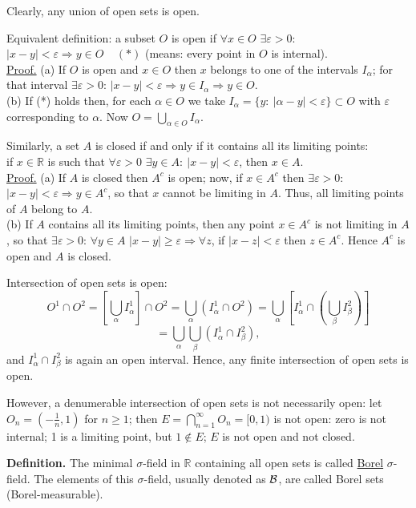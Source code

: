 \documentclass[a4paper,10pt]{article}
\def\RR{\mathbb{R}}
\newcommand{\1}[1]{\mathbf{1}_{\{#1\}}}
\begin{document}
Clearly, any union of open sets is open.

Equivalent definition: a subset $O$ is open if $\forall x\in O$ $\exists\varepsilon>0$: $|x-y|<\varepsilon\Longrightarrow y\in O~~~~~(*)$ (means: every point in $O$ is internal).\\
\underline{Proof.} (a) If $O$ is open and $x\in O$ then $x$ belongs to one of the intervals $I_\alpha$; for that interval $\exists\varepsilon>0$: $|x-y|<\varepsilon\Longrightarrow y\in I_\alpha \Longrightarrow y\in O$.\\
(b) If (*) holds then, for each $\alpha\in O$ we take $I_\alpha=\{y:~|\alpha-y|<\varepsilon\}\subset O$ with $\varepsilon$ corresponding to $\alpha$. Now $O=\bigcup_{\alpha\in O} I_\alpha$.
\blacksquare\vspace{3mm}

Similarly, a set $A$ is closed if and only if it contains all its limiting points:\\
if $x\in\RR$ is such that $\forall\varepsilon>0$ $\exists y\in A:~|x-y|<\varepsilon$, then $x\in A$.\\
\underline{Proof.} (a) If $A$ is closed then $A^c$ is open; now, if $x\in A^c$ then $\exists\varepsilon>0$: $|x-y|<\varepsilon\Longrightarrow y\in A^c$, so that $x$ cannot be limiting in $A$.
Thus, all limiting points of $A$ belong to $A$.\\
(b) If $A$ contains all its limiting points, then any point $x\in A^c$ is not limiting in $A$, so that $\exists\varepsilon>0$: $\forall y\in A$ $|x-y|\ge\varepsilon \Longrightarrow \forall z$, if $|x-z|<\varepsilon$ then $z\in A^c$. Hence $A^c$ is open and $A$ is closed. \blacksquare\vspace{3mm}

Intersection of open sets is open:
  $$O^1\cap O^2=\left[\bigcup_\alpha I^1_\alpha\right]\cap O^2=\bigcup_\alpha\left(I^1_\alpha\cap O^2\right)=\bigcup_\alpha\left[ I^1_\alpha\cap\left(\bigcup_\beta I^2_\beta\right)\right]$$
  $$=\bigcup_\alpha\bigcup_\beta \left( I^1_\alpha\cap I^2_\beta\right),$$
and $I^1_\alpha\cap I^2_\beta$ is again an open interval. Hence, any finite intersection of open sets is open.

However, a denumerable intersection of open sets is not necessarily open:
let $O_n=(-\frac{1}{n},1)$ for $n\ge 1$; then $E=\bigcap_{n=1}^\infty O_n=[0,1)$ is not open: zero is not internal; 1 is a limiting point, but $1\notin E$; $E$ is not open and not closed.\vspace{3mm}

{\bf Definition.} The minimal $\sigma$-field in $\RR$ containing all open sets is called \underline{Borel} $\sigma$-field. The elements of this $\sigma$-field, usually denoted as $\cal B$, are called Borel sets (Borel-measurable). \vspace{3mm}
\end{document}
